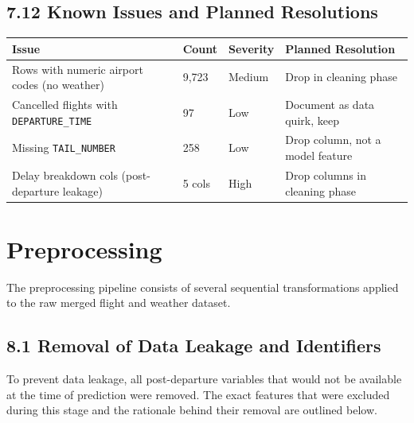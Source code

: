 \documentclass{article}
\newcommand{\code}[1]{\texttt{\small #1}}
\begin{document}
\subsection*{\textcolor{accentgold}{7.12 Known Issues and Planned Resolutions}}

\begin{tcolorbox}[mainbox, title={Known Issues}]
\renewcommand{\arraystretch}{1.4}
\begin{tabularx}{\textwidth}{X C{1.8cm} C{1.8cm} L{4.2cm}}
    \toprule
    \textbf{Issue} & \textbf{Count} & \textbf{Severity} & \textbf{Planned Resolution} \\
    \midrule
    Rows with numeric airport codes (no weather)          & 9,723  & Medium & Drop in cleaning phase \\
    Cancelled flights with \code{DEPARTURE\_TIME}         & 97     & Low    & Document as data quirk, keep \\
    Missing \code{TAIL\_NUMBER}                           & 258    & Low    & Drop column, not a model feature \\
    Delay breakdown cols (post-departure leakage)          & 5 cols & High   & Drop columns in cleaning phase \\
    \bottomrule
\end{tabularx}
\end{tcolorbox}

\section{\textcolor{accentblue}{Preprocessing}}

The preprocessing pipeline consists of several sequential transformations applied to the raw merged flight and weather dataset.

\subsection*{\textcolor{accentgold}{8.1 Removal of Data Leakage and Identifiers}}
To prevent data leakage, all post-departure variables that would not be available at the time of prediction were removed. The exact features that were excluded during this stage and the rationale behind their removal are outlined below.
\end{document}
